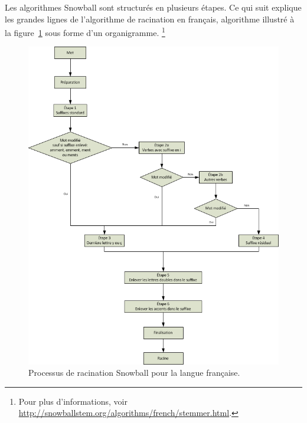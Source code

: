 Les algorithmes Snowball sont structur\'es en plusieurs \'etapes.
Ce qui suit explique les grandes lignes de l'algorithme de racination en fran\c{c}ais, algorithme illustr\'e \`a la figure~\ref{snowball-process} sous forme d'un organigramme.%
\footnote{Pour plus d'informations, voir \url{http://snowballstem.org/algorithms/french/stemmer.html}.}

\begin{figure}[h!]
  \includegraphics[scale=0.85]{images/snowball.png}
  \caption{Processus de racination Snowball pour la langue fran\c{c}aise.}
  \label{snowball-process}
\end{figure}

\newcommand{\ETAPE}[1]{\item{\emph{#1}}}

